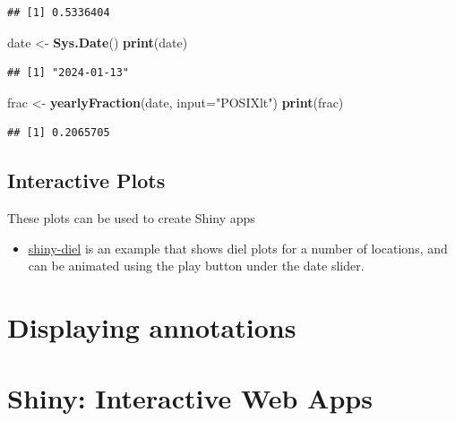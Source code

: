 \documentclass[
]{book}
\newenvironment{Shaded}{\begin{snugshade}}{\end{snugshade}}
\newcommand{\AttributeTok}[1]{\textcolor[rgb]{0.13,0.29,0.53}{#1}}
\newcommand{\FunctionTok}[1]{\textcolor[rgb]{0.13,0.29,0.53}{\textbf{#1}}}
\newcommand{\NormalTok}[1]{#1}
\newcommand{\OtherTok}[1]{\textcolor[rgb]{0.56,0.35,0.01}{#1}}
\newcommand{\StringTok}[1]{\textcolor[rgb]{0.31,0.60,0.02}{#1}}
\providecommand{\tightlist}{%
  \setlength{\itemsep}{0pt}\setlength{\parskip}{0pt}}
\begin{document}
\begin{verbatim}
## [1] 0.5336404
\end{verbatim}

\begin{Shaded}
\begin{Highlighting}[]
\NormalTok{date }\OtherTok{\textless{}{-}} \FunctionTok{Sys.Date}\NormalTok{()}
\FunctionTok{print}\NormalTok{(date)}
\end{Highlighting}
\end{Shaded}

\begin{verbatim}
## [1] "2024-01-13"
\end{verbatim}

\begin{Shaded}
\begin{Highlighting}[]
\NormalTok{frac }\OtherTok{\textless{}{-}} \FunctionTok{yearlyFraction}\NormalTok{(date, }\AttributeTok{input=}\StringTok{"POSIXlt"}\NormalTok{)}
\FunctionTok{print}\NormalTok{(frac)}
\end{Highlighting}
\end{Shaded}

\begin{verbatim}
## [1] 0.2065705
\end{verbatim}

\hypertarget{interactive-plots}{%
\section{Interactive Plots}\label{interactive-plots}}

These plots can be used to create Shiny apps

\begin{itemize}
\tightlist
\item
  \href{https://shiny.ebaker.me.uk/shiny-diel/}{shiny-diel} is an example that shows diel plots for a number of locations, and can be animated using the play button under the date slider.
\end{itemize}

\hypertarget{displaying-annotations}{%
\chapter{Displaying annotations}\label{displaying-annotations}}

\hypertarget{shiny-interactive-web-apps}{%
\chapter{Shiny: Interactive Web Apps}\label{shiny-interactive-web-apps}}
\end{document}
